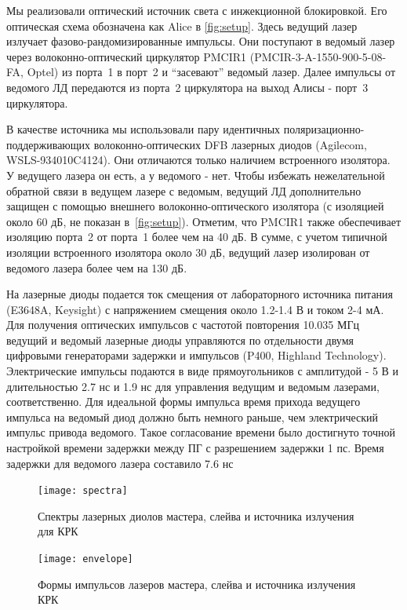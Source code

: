 Мы реализовали оптический источник света с инжекционной блокировкой. Его оптическая схема обозначена как Alice в \cref{fig:setup}. Здесь ведущий лазер излучает фазово-рандомизированные импульсы. Они поступают в ведомый лазер через волоконно-оптический циркулятор PMCIR1 (PMCIR-3-A-1550-900-5-08-FA, Optel) из порта~1 в порт~2 и ``засевают'' ведомый лазер. Далее импульсы от ведомого ЛД передаются из порта~2 циркулятора на выход Алисы - порт~3 циркулятора.

В качестве источника мы использовали пару идентичных поляризационно-поддерживающих волоконно-оптических DFB лазерных диодов (Agilecom, WSLS-934010C4124). Они отличаются только наличием встроенного изолятора. У ведущего лазера он есть, а у ведомого - нет. Чтобы избежать нежелательной обратной связи в ведущем лазере с ведомым, ведущий ЛД дополнительно защищен с помощью внешнего волоконно-оптического изолятора (с изоляцией около 60 дБ, не показан в~\cref{fig:setup}). Отметим, что PMCIR1 также обеспечивает изоляцию порта~2 от порта~1 более чем на 40 дБ. В сумме, с учетом типичной изоляции встроенного изолятора около 30 дБ, ведущий лазер изолирован от ведомого лазера более чем на 130 дБ.
 
На лазерные диоды подается ток смещения от лабораторного источника питания (E3648A, Keysight) с напряжением смещения около 1.2-1.4 В и током 2-4 мА. Для получения оптических импульсов с частотой повторения 10.035 МГц ведущий и ведомый лазерные диоды управляются по отдельности двумя цифровыми генераторами задержки и импульсов (P400, Highland Technology). Электрические импульсы подаются в виде прямоугольников с амплитудой - 5 В и длительностью 2.7 нс и 1.9 нс  для управления ведущим и ведомым лазерами, соответственно. Для идеальной формы импульса время прихода ведущего импульса на ведомый диод должно быть немного раньше, чем электрический импульс привода ведомого. Такое согласование времени было достигнуто точной настройкой времени задержки между ПГ с разрешением задержки 1 пс. Время задержки для ведомого лазера составило 7.6 нс
\begin{figure}
	\centering
	\texttt{[image: spectra]}
	\caption{Спектры лазерных диолов мастера, слейва и источника излучения для КРК}
\end{figure}\label{fig:QKD_source_spectra}

\begin{figure}
	\centering
	\texttt{[image: envelope]}
	\caption{Формы импульсов лазеров мастера, слейва и источника излучения КРК}
\end{figure}\label{fig:QKD_source_pulse}

